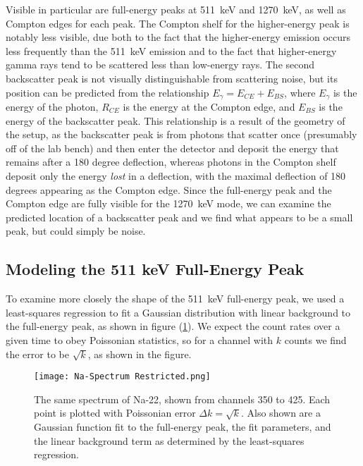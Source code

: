 \documentclass[letter]{article}
\begin{document}
 Visible in particular are full-energy peaks at \qty{511}{\kilo\electronvolt} and \qty{1270}{\kilo\electronvolt}, as well as Compton edges for each peak. The Compton shelf for the higher-energy peak is notably less visible, due both to the fact that the higher-energy emission occurs less frequently than the \qty{511}{\kilo\electronvolt} emission and to the fact that higher-energy gamma rays tend to be scattered less than low-energy rays. The second backscatter peak is not visually distinguishable from scattering noise, but its position can be predicted from the relationship $E_\gamma = E_{CE} + E_{BS}$, where $E_\gamma$ is the energy of the photon, $R_{CE}$ is the energy at the Compton edge, and $E_{BS}$ is the energy of the backscatter peak. This relationship is a result of the geometry of the setup, as the backscatter peak is from photons that scatter once (presumably off of the lab bench) and then enter the detector and deposit the energy that remains after a 180 degree deflection, whereas photons in the Compton shelf deposit only the energy \textit{lost} in a deflection, with the maximal deflection of 180 degrees appearing as the Compton edge. Since the full-energy peak and the Compton edge are fully visible for the \qty{1270}{\kilo\electronvolt} mode, we can examine the predicted location of a backscatter peak and we find what appears to be a small peak, but could simply be noise. 

\subsection{Modeling the 511 keV Full-Energy Peak}

To examine more closely the shape of the \qty{511}{\kilo\electronvolt} full-energy peak, we used a least-squares regression to fit a Gaussian distribution with linear background to the full-energy peak, as shown in figure (\ref{fig:NaSpecRestr}). We expect the count rates over a given time to obey Poissonian statistics, so for a channel with $k$ counts we find the error to be $\sqrt{k}$, as shown in the figure.

\begin{figure}[h] \centering
    \texttt{[image: Na-Spectrum Restricted.png]}
    \caption{The same spectrum of Na-22, shown from channels 350 to 425. Each point is plotted with Poissonian error $\Delta k = \sqrt{k}$. Also shown are a Gaussian function fit to the full-energy peak, the fit parameters, and the linear background term as determined by the least-squares regression.}
    \label{fig:NaSpecRestr}
\end{figure}
\end{document}

